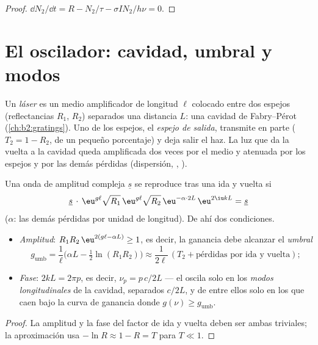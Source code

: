 \begin{proof}
$\dd N_2/\dd t = R - N_2/\tau - \sigma I N_2/h\nu = 0$.
\end{proof}

\section{El oscilador: cavidad, umbral y modos}

\begin{definition}\label{def:b2:laser:cavity}
Un \emph{láser} es un medio amplificador de longitud $\ell$
colocado entre dos espejos (reflectancias $R_1$, $R_2$) separados una distancia $L$:
una cavidad de Fabry--Pérot (\cref{ch:b2:gratings}). Uno de los espejos, el
\emph{espejo de salida}, transmite en parte ($T_2 = 1 - R_2$, de un pequeño
porcentaje) y deja salir el haz. La luz que da la vuelta a la cavidad queda
amplificada dos veces por el medio y atenuada por los espejos y por las
demás pérdidas (dispersión, , ).
\end{definition}

\begin{theorem}\label{thm:b2:laser:threshold}
Una onda de amplitud compleja $\underline s$ se reproduce tras una
ida y vuelta si
\[
\underline s\,\cdot\, \eu^{g\ell}\sqrt{R_1}\,\eu^{g\ell}\sqrt{R_2}\,
\eu^{-\alpha\cdot 2L}\,\eu^{2\iu kL} = \underline s
\]
($\alpha$: las demás pérdidas por unidad de longitud). De ahí dos condiciones.
\begin{itemize}
\item \emph{Amplitud}: $R_1R_2\,\eu^{2(g\ell - \alpha L)} \ge 1$, es decir, la
      ganancia debe alcanzar el \emph{umbral}
      \[
      g_{\text{umb}} = \frac{1}{\ell}\Big(\alpha L - \tfrac12\ln(R_1R_2)\Big)
      \approx \frac{1}{2\ell}\,(T_2 + \text{pérdidas por ida y vuelta}) ;
      \]
\item \emph{Fase}: $2kL = 2\pi p$, es decir, $\nu_p = p\,c/2L$ --- el 
      oscila solo en los \emph{modos longitudinales} de la cavidad, separados $c/2L$, y de entre ellos solo en
      los que caen bajo la curva de ganancia donde $g(\nu) \ge g_{\text{umb}}$.
\end{itemize}
\end{theorem}

\begin{proof}
La amplitud y la fase del factor de ida y vuelta deben ser ambas triviales; la
aproximación usa $-\ln R \approx 1 - R = T$ para $T \ll 1$.
\end{proof}


